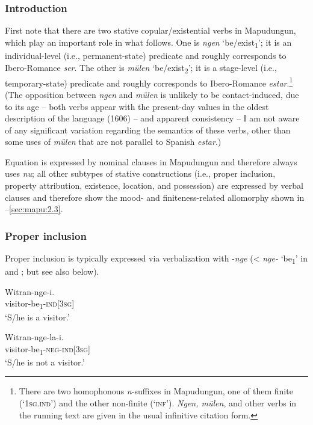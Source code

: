 \documentclass[output=paper,colorlinks,citecolor=brown,draft]{langscibook}
\begin{document}
\subsubsection{Introduction}\label{sec:mapu:2.3intro}
First note that there are two stative copular/existential verbs in Mapudungun, which play an important role in what follows. One is \textit{ngen} ‘be/exist\textsubscript{1}’; it is an individual-level (i.e., permanent-state) predicate and roughly corresponds to Ibe\-ro-Romance \textit{ser}. The other is \textit{mülen} ‘be/exist\textsubscript{2}’; it is a stage-level (i.e., temporary-state) predicate and roughly corresponds to Ibero-Romance \textit{estar}.\footnote{There are two homophonous \textit{n}{}-suffixes in Mapudungun, one of them finite (‘\textsc{1sg.ind’}) and the other non-finite (‘\textsc{inf’}). \textit{Ngen, mülen}, and other verbs in the running text are given in the usual infinitive citation form.} (The opposition between \textit{ngen} and \textit{mülen} is unlikely to be contact-induced, due to its age -- both verbs appear with the present-day values in the oldest description of the language (1606) -- and apparent consistency -- I am not aware of any significant variation regarding the semantics of these verbs, other than some uses of \textit{mülen} that are not parallel to Spanish \textit{estar}.)

Equation is expressed by nominal clauses in Mapudungun and therefore always uses \textit{nu}; all other subtypes of stative constructions (i.e., proper inclusion, property attribution, existence, location, and possession) are expressed by verbal clauses and therefore show the mood- and finiteness-related allomorphy shown in --\ref{sec:mapu:2.3}. 
\subsubsection{Proper inclusion}
\label{sec:mapu:2.3.1}

Proper inclusion is typically expressed via verbalization with \nobreakdash-\textit{nge} (< \textit{nge-} ‘be\textsubscript{1}’ in  and ; but see also  below).

\ea\label{ex:mapu:5}
    \ea\label{ex:mapu:5a}
        \gll Witran-nge{}-i.\\
             {visitor-be\textsubscript{1}{}-\textsc{ind[3sg]}} \\ 
        \glt ‘S/he is a visitor.'
    
    \ex\label{ex:mapu:5b}
        \gll Witran-nge-la-i. \\
             {visitor-be\textsubscript{1}{}-\textsc{neg-ind[3sg]}} \\
        \glt ‘S/he is not a visitor.’
\end{document}
